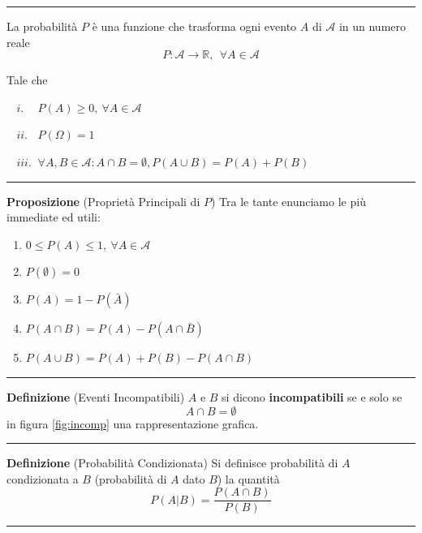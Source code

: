 \documentclass[
  11pt,
]{book}
\theoremstyle{mytheoremstyle}
\theoremstyle{mydefstyle}
\begin{document}
\begin{center}\rule{0.5\linewidth}{0.5pt}\end{center}

La probabilità \(P\) è una funzione che trasforma ogni evento \(A\) di
\(\mathscr{A}\) in un numero reale
\[P:\mathscr{A}\to\mathbb{R},~~\forall A\in\mathscr{A}\]

Tale che

\(~~~~i.\phantom{i}\phantom{i}~\) \(P(A)\ge 0,~\forall A\in\mathscr{A}\)

\(~~~~ii.\phantom{i}~\) \(P(\Omega)=1\)

\(~~~~iii.~\)
\(\forall A,B\in\mathscr{A}:A\cap B=\emptyset, P(A\cup B)=P(A)+P(B)\)

\begin{center}\rule{0.5\linewidth}{0.5pt}\end{center}

\textbf{Proposizione} (Proprietà Principali di \(P\))
Tra le tante enunciamo le più immediate ed utili:

\begin{enumerate}
\def\labelenumi{\arabic{enumi}.}
\item
  \(0\le P(A) \le 1,~\forall A\in\mathscr{A}\)
\item
  \(P(\emptyset)=0\)
\item
  \(P(A)=1-P(\bar A)\)
\item
  \(P(A\cap B)=P(A)-P(A\cap \bar B)\)
\item
  \(P(A\cup B)=P(A)+P(B)-P(A\cap B)\)
\end{enumerate}

\begin{center}\rule{0.5\linewidth}{0.5pt}\end{center}

\textbf{Definizione} (Eventi Incompatibili)
\(A\) e \(B\) si dicono \textbf{incompatibili} se e solo se
\[A\cap B = \emptyset\] in figura \ref{fig:incomp} una rappresentazione
grafica.

\begin{center}\rule{0.5\linewidth}{0.5pt}\end{center}

\textbf{Definizione} (Probabilità Condizionata)
Si definisce probabilità di \(A\) condizionata a \(B\) (probabilità di \(A\)
dato \(B\)) la quantità
\[
P(A|B)=\frac{P(A\cap B)}{P(B)}
\]

\begin{center}\rule{0.5\linewidth}{0.5pt}\end{center}
\end{document}
